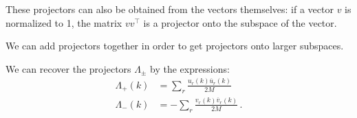 \documentclass[main.tex]{subfiles}
\begin{document}
These projectors can also be obtained from the vectors themselves: if a vector \(v\) is normalized to 1, the matrix \(v v ^{\top}\) is a projector onto the subspace of the vector.

We can add projectors together in order to get projectors onto larger subspaces.

\begin{claim}
We can recover the projectors \(\Lambda_{\pm }\) by the expressions: 
%
\begin{subequations}
\begin{align}
\Lambda_{+} (k) &= \sum_{r} \frac{u_r(k) \overline{u}_{r} (k)}{2M} \\
\Lambda_{-} (k) &= - \sum_{r} \frac{v_r(k) \overline{v}_{r} (k)}{2M} 
\,.
\end{align}
\end{subequations}
\end{claim}
\end{document}
